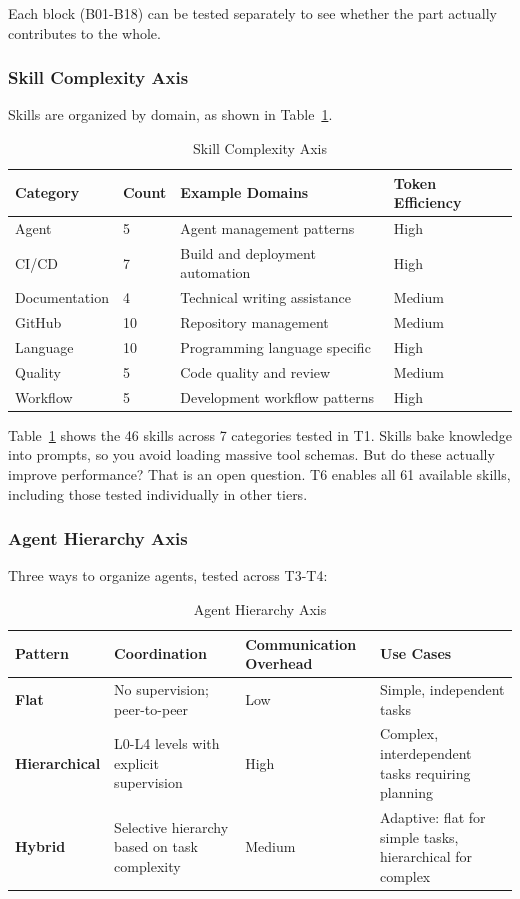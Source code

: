 \documentclass[11pt]{article}
\begin{document}
Each block (B01-B18) can be tested separately to see whether the part actually
contributes to the whole.

\subsubsection{Skill Complexity Axis}

Skills are organized by domain, as shown in Table~\ref{tab:skill-complexity}.

\begin{table}[htbp]
\centering
\caption{Skill Complexity Axis}
\label{tab:skill-complexity}
\begin{tabularx}{\textwidth}{llXl}
\toprule
Category & Count & Example Domains & Token Efficiency \\
\midrule
Agent & 5 & Agent management patterns & High \\
CI/CD & 7 & Build and deployment automation & High \\
Documentation & 4 & Technical writing assistance & Medium \\
GitHub & 10 & Repository management & Medium \\
Language & 10 & Programming language specific & High \\
Quality & 5 & Code quality and review & Medium \\
Workflow & 5 & Development workflow patterns & High \\
\bottomrule
\end{tabularx}
\end{table}

Table~\ref{tab:skill-complexity} shows the 46 skills across 7 categories tested in T1. Skills bake knowledge into prompts, so
you avoid loading massive tool schemas. But do these actually improve
performance? That is an open question. T6 enables all 61 available skills, including those tested individually in other tiers.

\subsubsection{Agent Hierarchy Axis}

Three ways to organize agents, tested across T3-T4:


\begin{table}[htbp]
\centering
\caption{Agent Hierarchy Axis}
\begin{tabularx}{\textwidth}{lXXX}
\toprule
Pattern & Coordination & Communication Overhead & Use Cases \\
\midrule
\textbf{Flat} & No supervision; peer-to-peer & Low & Simple, independent tasks \\
\textbf{Hierarchical} & L0-L4 levels with explicit supervision & High & Complex, interdependent tasks requiring planning \\
\textbf{Hybrid} & Selective hierarchy based on task complexity & Medium & Adaptive: flat for simple tasks, hierarchical for complex \\
\bottomrule
\end{tabularx}
\end{table}
\end{document}
